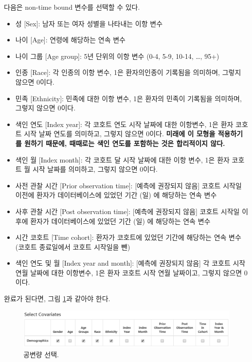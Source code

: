 \documentclass[11pt]{book}
\providecommand{\tightlist}{%
  \setlength{\itemsep}{0pt}\setlength{\parskip}{0pt}}
\theoremstyle{definition}
\theoremstyle{definition}
\theoremstyle{definition}
\theoremstyle{remark}
\begin{document}
다음은 non-time bound 변수를 선택할 수 있다.

\begin{itemize}
\tightlist
\item
  성 {[}Sex{]}: 남자 또는 여자 성별을 나타내는 이항 변수
\item
  나이 {[}Age{]}: 연령에 해당하는 연속 변수
\item
  나이 그룹 {[}Age group{]}: 5년 단위의 이항 변수 (0-4, 5-9, 10-14,
  \ldots{}, 95+)
\item
  인종 {[}Race{]}: 각 인종의 이항 변수, 1은 환자의인종이 기록됨을
  의미하며, 그렇지 않으면 0이다.
\item
  민족 {[}Ethnicity{]}: 민족에 대한 이항 변수, 1은 환자의 민족이
  기록됨을 의미하며, 그렇지 않으면 0이다.
\item
  색인 연도 {[}Index year{]}: 각 코호트 연도 시작 날짜에 대한 이항변수,
  1은 환자 코호트 시작 날짜 연도를 의미하고, 그렇지 않으면 0이다.
  \textbf{미래에 이 모형을 적용하기를 원하기 때문에, 때때로는 색인
  연도를 포함하는 것은 합리적이지 않다.}
\item
  색인 월 {[}Index month{]}: 각 코호트 달 시작 날짜에 대한 이항 변수,
  1은 환자 코호트 월 시작 날짜를 의미하고, 그렇지 않으면 0이다.
\item
  사전 관찰 시간 {[}Prior observation time{]}: {[}예측에 권장되지
  않음{]} 코호트 시작일 이전에 환자가 데이터베이스에 있었던 기간 (일) 에
  해당하는 연속 변수
\item
  사후 관찰 시간 {[}Post observation time{]}: {[}예측에 권장되지 않음{]}
  코호트 시작일 이후에 환자가 데이터베이스에 있었던 기간 (일) 에
  해당하는 연속 변수
\item
  시간 코호트 {[}Time cohort{]}: 환자가 코호트에 있었던 기간에 해당하는
  연속 변수 (코호트 종료일에서 코호트 시작일을 뺀)
\item
  색인 연도 및 월 {[}Index year and month{]}: {[}예측에 권장되지 않음{]}
  각 코호트 시작 연월 날짜에 대한 이항변수, 1은 환자 코호트 시작 연월
  날짜이고, 그렇지 않으면 0이다.
\end{itemize}

완료가 된다면, 그림 \ref{fig:covariateSettings2}과 같아야 한다.

\begin{figure}

{\centering \includegraphics[width=1\linewidth]{images/PatientLevelPrediction/covariateSettings2} 

}

\caption{공변량 선택.}\label{fig:covariateSettings2}
\end{figure}
\end{document}
